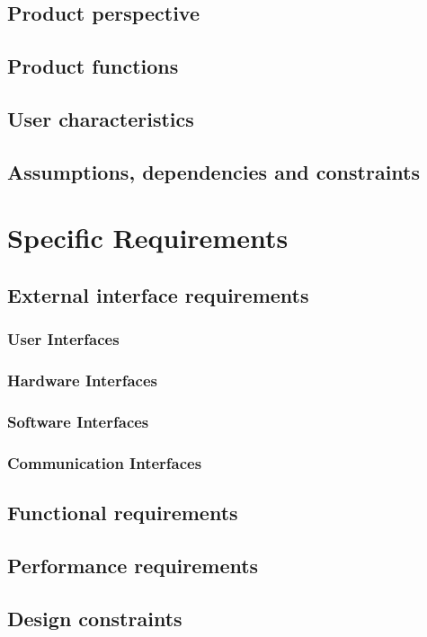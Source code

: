 \documentclass[a4paper]{report}
\begin{document}
\section{Product perspective}
\lipsum[1]
\section{Product functions}
\lipsum[1]
\section{User characteristics}
\lipsum[1]
\section{Assumptions, dependencies and constraints}
\lipsum[1]


\chapter{Specific Requirements}
\lipsum[1]
\section{External interface requirements}
\subsection{User Interfaces}
\lipsum[1]
\subsection{Hardware Interfaces}
\lipsum[1]
\subsection{Software Interfaces}
\lipsum[1]
\subsection{Communication Interfaces}
\lipsum[1]
\section{Functional requirements}
\lipsum[1]
\section{Performance requirements}
\lipsum[1]
\section{Design constraints}
\end{document}
